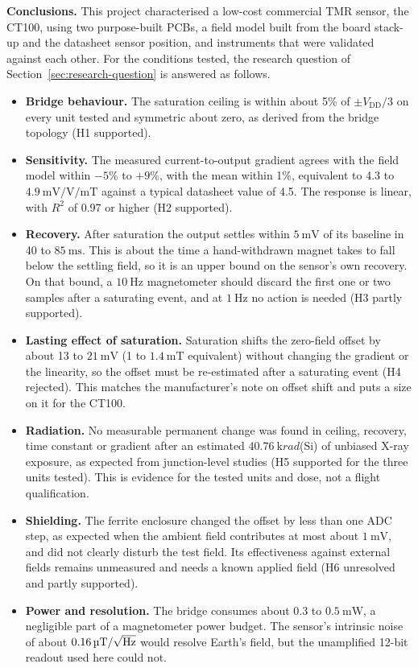 \documentclass[12pt,a4paper]{article}
\begin{document}
\textbf{Conclusions.} This project characterised a low-cost commercial TMR sensor, the CT100, using two purpose-built PCBs, a field model built from the board stack-up and the datasheet sensor position, and instruments that were validated against each other. For the conditions tested, the research question of Section~\ref{sec:research-question} is answered as follows.
\begin{itemize}
\item \textbf{Bridge behaviour.} The saturation ceiling is within about 5\% of $\pm V_{\text{DD}}/3$ on every unit tested and symmetric about zero, as derived from the bridge topology (H1 supported).
\item \textbf{Sensitivity.} The measured current-to-output gradient agrees with the field model within $-5\%$ to $+9\%$, with the mean within 1\%, equivalent to 4.3 to $\SI{4.9}{\milli\volt\per\volt\per\milli\tesla}$ against a typical datasheet value of 4.5. The response is linear, with $R^2$ of 0.97 or higher (H2 supported).
\item \textbf{Recovery.} After saturation the output settles within $\SI{5}{\milli\volt}$ of its baseline in 40 to $\SI{85}{\milli\second}$. This is about the time a hand-withdrawn magnet takes to fall below the settling field, so it is an upper bound on the sensor's own recovery. On that bound, a $\SI{10}{\hertz}$ magnetometer should discard the first one or two samples after a saturating event, and at $\SI{1}{\hertz}$ no action is needed (H3 partly supported).
\item \textbf{Lasting effect of saturation.} Saturation shifts the zero-field offset by about 13 to $\SI{21}{\milli\volt}$ (1 to $\SI{1.4}{\milli\tesla}$ equivalent) without changing the gradient or the linearity, so the offset must be re-estimated after a saturating event (H4 rejected). This matches the manufacturer's note on offset shift and puts a size on it for the CT100.
\item \textbf{Radiation.} No measurable permanent change was found in ceiling, recovery, time constant or gradient after an estimated $\SI{40.76}{\kilo rad}$(Si) of unbiased X-ray exposure, as expected from junction-level studies (H5 supported for the three units tested). This is evidence for the tested units and dose, not a flight qualification.
\item \textbf{Shielding.} The ferrite enclosure changed the offset by less than one ADC step, as expected when the ambient field contributes at most about $\SI{1}{\milli\volt}$, and did not clearly disturb the test field. Its effectiveness against external fields remains unmeasured and needs a known applied field (H6 unresolved and partly supported).
\item \textbf{Power and resolution.} The bridge consumes about 0.3 to $\SI{0.5}{\milli\watt}$, a negligible part of a magnetometer power budget. The sensor's intrinsic noise of about $\SI{0.16}{\micro\tesla\per\sqrt{\hertz}}$ would resolve Earth's field, but the unamplified 12-bit readout used here could not.
\end{itemize}
\end{document}

